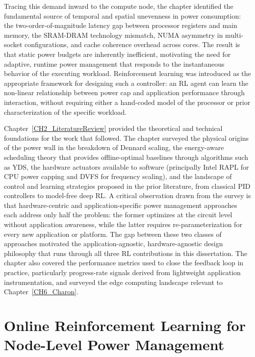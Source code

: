 Tracing this demand inward to the compute node, the chapter identified the fundamental
source of temporal and spatial unevenness in power consumption: the two-order-of-magnitude
latency gap between processor registers and main memory, the SRAM-DRAM technology
mismatch, NUMA asymmetry in multi-socket configurations, and cache coherence overhead
across cores.
The result is that static power budgets are inherently inefficient, motivating the
need for adaptive, runtime power management that responds to the instantaneous behavior
of the executing workload.
Reinforcement learning was introduced as the appropriate framework for designing such a
controller: an RL agent can learn the non-linear relationship between power cap and
application performance through interaction, without requiring either a hand-coded model
of the processor or prior characterization of the specific workload.

Chapter~\ref{CH2_LiteratureReview} provided the theoretical and technical foundations
for the work that followed.
The chapter surveyed the physical origins of the power wall in the breakdown of
Dennard scaling, the energy-aware scheduling theory that provides offline-optimal
baselines through algorithms such as YDS, the hardware actuators available to software
(principally Intel RAPL for CPU power capping and DVFS for frequency scaling), and the
landscape of control and learning strategies proposed in the prior literature, from
classical PID controllers to model-free deep RL.
A critical observation drawn from the survey is that hardware-centric and
application-specific power management approaches each address only half the problem:
the former optimizes at the circuit level without application awareness, while the
latter requires re-parameterization for every new application or platform.
The gap between these two classes of approaches motivated the application-agnostic,
hardware-agnostic design philosophy that runs through all three RL contributions in
this dissertation.
The chapter also covered the performance metrics used to close the feedback loop in
practice, particularly progress-rate signals derived from lightweight application
instrumentation, and surveyed the edge computing landscape relevant to
Chapter~\ref{CH6_Charon}.

\section{Online Reinforcement Learning for Node-Level Power Management}

